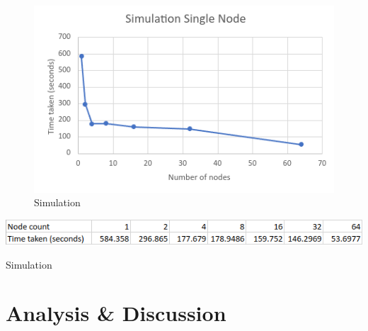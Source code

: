 \documentclass{article}
\begin{document}
\clearpage
\begin{figure}[!htb]
\includegraphics[width=\textwidth]{single-node/simulation.png}
\caption{Simulation}
\label{fig:10}
\end{figure}
\begin{table}[!htb]
\includegraphics[width=\textwidth]{single-node/simulation-table.png}
\caption{Simulation}
\label{tab:10}
\end{table}

\section*{Analysis \& Discussion}
\end{document}
